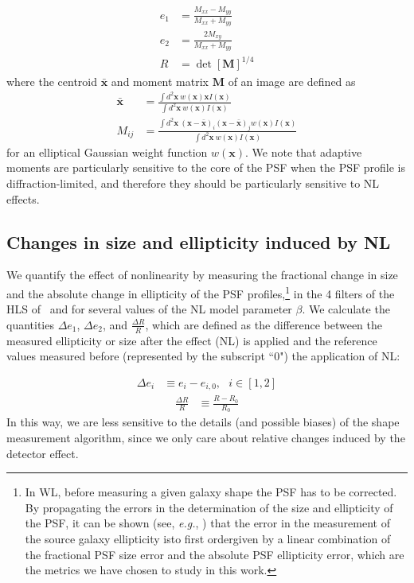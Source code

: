 \documentclass[preprint]{aastex}
\begin{document}
\begin{align}
e_1&=\frac{M_{xx} - M_{yy}}{M_{xx}+M_{yy}} \\
e_2&=\frac{2 M_{xy}}{M_{xx}+M_{yy}} \\
R&=\det[\mathbf{M}]^{1/4}
 \end{align}
where the centroid $\mathbf{\bar{x}}$ and moment matrix $\mathbf{M}$ of an image are defined as
\begin{align}
\mathbf{\bar{x}}&=\frac{\int d^2\mathbf{x}\ w(\mathbf{x}) \mathbf{x} I(\mathbf{x})}{\int d^2 \mathbf{x}\ w(\mathbf{x})I(\mathbf{x})} \\
M_{ij}&=\frac{\int d^2\mathbf{x}\ (\mathbf{x} - \mathbf{\bar{x}})_i  (\mathbf{x} - \mathbf{\bar{x}})_j w(\mathbf{x}) I(\mathbf{x})} {\int d^2\mathbf{x}\ w(\mathbf{x})I(\mathbf{x})}
\end{align}
for an elliptical Gaussian weight function $w(\mathbf{x})$. 
We note that adaptive moments are particularly sensitive to the core of the PSF when the PSF profile is diffraction-limited, and therefore they should be particularly sensitive to NL effects.

\subsection{Changes in size and ellipticity induced by NL}

We quantify the effect of nonlinearity by measuring the fractional change in size and the absolute change in ellipticity of the PSF profiles,\footnote{In WL, before measuring a given galaxy shape the PSF has to be corrected. By propagating the errors in the determination of the size and ellipticity of the PSF, it can be shown (see, \emph{e.g.}, \citealt{paulin08}) that the error in the measurement of the source galaxy ellipticity is\textemdash to first order\textemdash given by a linear combination of the fractional PSF size error and the absolute PSF ellipticity error, which are the metrics we have chosen to study in this work.} in the 4 filters of the HLS of \wfa\, and for several values of the NL model parameter $\beta$. We calculate the quantities $\Delta e_1$, $\Delta e_2$, and $\frac{\Delta R}{R}$, which are defined as the difference between the measured ellipticity or size after the effect (NL) is applied and the reference values measured before (represented by the subscript ``$0$") the application of NL:

\begin{align}
\Delta e_{i} &\equiv e_{i} - e_{i,0},\ \ \ i\in[1,2]  
\label{delta_e}
\end{align}
\begin{align}
\frac{\Delta R}{R} &\equiv \frac {{R} - R_{0}}  { R_{0}}
\label{delta_r}
\end{align}
In this way, we are less sensitive to the details (and possible biases) of the shape measurement algorithm, since we only care about relative changes induced by the detector effect. 
\end{document}
